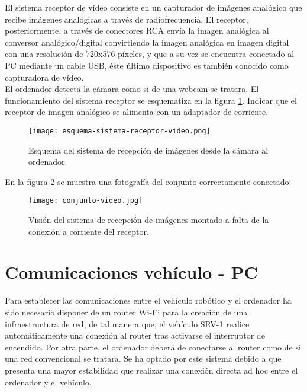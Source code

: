 El sistema receptor de vídeo consiste en un capturador de imágenes analógico que recibe imágenes analógicas a través de radiofrecuencia. El receptor, posteriormente, a través de conectores RCA envía la imagen analógica al conversor analógico/digital convirtiendo la imagen analógica en imagen digital con una resolución de 720x576 píxeles, y que a su vez se encuentra conectado al PC mediante un cable USB, éste último dispositivo es también conocido como capturadora de vídeo.\\

El ordenador detecta la cámara como si de una webcam se tratara. El funcionamiento del sistema receptor se esquematiza en la figura \ref{esquema-sistema-receptor-video}. Indicar que el receptor de imagen analógico se alimenta con un adaptador de corriente. \\

\begin{figure}[H]
  \begin{center}
    \texttt{[image: esquema-sistema-receptor-video.png]}
  \end{center}
  \caption{Esquema del sistema de recepción de imágenes desde la cámara al ordenador.}
  \label{esquema-sistema-receptor-video}
\end{figure}

En la figura \ref{fig:conjunto-video} se muestra una fotografía del conjunto correctamente conectado:\\

\begin{figure}[H]
  \begin{center}
    \texttt{[image: conjunto-video.jpg]}
  \end{center}
  \caption{Visión del sistema de recepción de imágenes montado a falta de la conexión a corriente del receptor.}
  \label{fig:conjunto-video}
\end{figure}


\section{Comunicaciones vehículo - PC}

Para establecer las comunicaciones entre el vehículo robótico y el ordenador ha sido necesario disponer de un router Wi-Fi para la creación de una infraestructura de red, de tal manera que, el vehículo SRV-1 realice automáticamente una conexión al router tras activarse el interruptor de encendido. Por otra parte, el ordenador deberá de conectarse al router como de si una red convencional se tratara. Se ha optado por este sistema debido a que presenta una mayor estabilidad que realizar una conexión directa ad hoc entre el ordenador y el vehículo.\\

